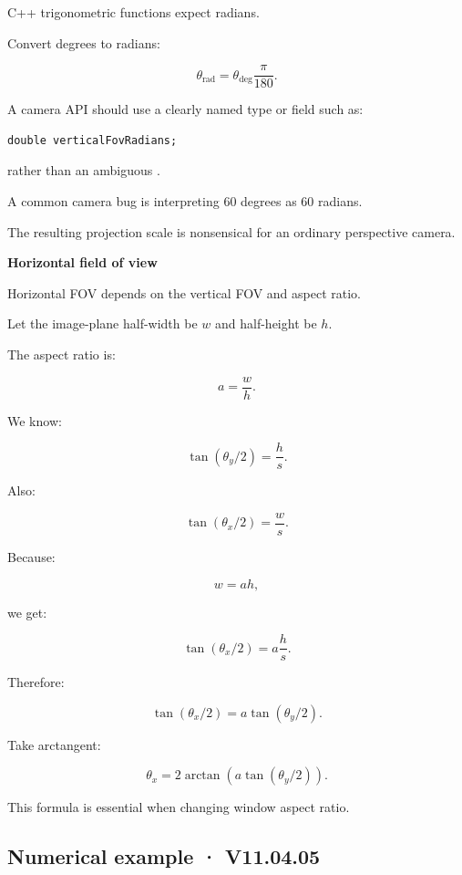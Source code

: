\hypertarget{02-foundations-ii-ch033-units-degrees-versus-radians}{}

C++ trigonometric functions expect radians.

Convert degrees to radians:

\[
 \boxed{ \theta_{\mathrm{rad}}= \theta_{\mathrm{deg}}\frac\pi{180} }.
\]

A camera API should use a clearly named type or field such as:

\begin{verbatim}
double verticalFovRadians;
\end{verbatim}

rather than an ambiguous .

A common camera bug is interpreting 60 degrees as 60 radians.

The resulting projection scale is nonsensical for an ordinary perspective camera.

\textbf{Horizontal field of view}

Horizontal FOV depends on the vertical FOV and aspect ratio.

Let the image-plane half-width be \(w\) and half-height be \(h\).

The aspect ratio is:

\[
 a=\frac wh.
\]

We know:

\[
 \tan(\theta_y/2)=\frac hs.
\]

Also:

\[
 \tan(\theta_x/2)=\frac ws.
\]

Because:

\[
 w=ah,
\]

we get:

\[
 \tan(\theta_x/2) = a\frac hs.
\]

Therefore:

\[
 \boxed{ \tan(\theta_x/2) = a\tan(\theta_y/2) }.
\]

Take arctangent:

\[
 \boxed{ \theta_x= 2\arctan \left( a\tan(\theta_y/2) \right) }.
\]

This formula is essential when changing window aspect ratio.

\subsection{Numerical example · V11.04.05}\label{02-foundations-ii-ch033-numerical-example-v11.04.05}


